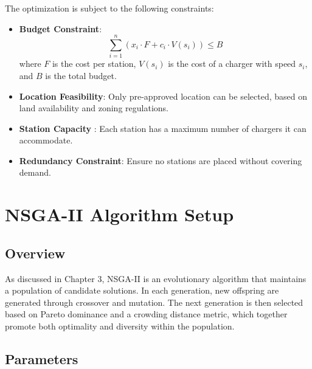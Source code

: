 The optimization is subject to the following constraints:

\begin{itemize}
    \item \textbf{Budget Constraint}:
    \[
    \sum_{i=1}^{n} \left(x_i \cdot F + c_i \cdot V(s_i)\right) \leq B
    \]
    where $F$ is the cost per station, $V(s_i)$ is the cost of a charger with speed $s_i$, and $B$ is the total budget.
    
    \item \textbf{Location Feasibility}: Only pre-approved location can be selected, based on land availability and zoning regulations.

    \item \textbf{Station Capacity }: Each station has a maximum number of chargers it can accommodate.

    \item \textbf{Redundancy Constraint}: Ensure no  stations are placed without covering demand.
\end{itemize}



\section{NSGA-II Algorithm Setup}

\subsection{Overview}

As discussed in Chapter 3, NSGA-II is an evolutionary algorithm that maintains a population of candidate solutions. In each generation, new offspring are generated through crossover and mutation. The next generation is then selected based on Pareto dominance and a crowding distance metric, which together promote both optimality and diversity within the population.

\subsection{Parameters}

